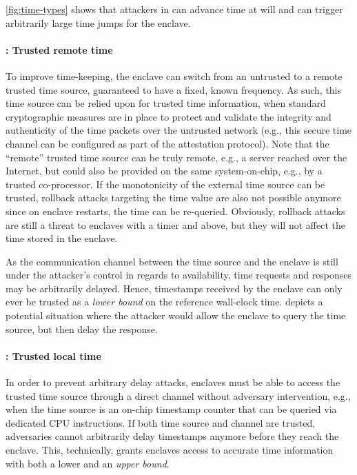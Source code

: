 \cref{fig:time-types} shows that attackers in \Tone{} can advance time at will
and can trigger arbitrarily large time jumps for the enclave.

\paragraph{\Ttwo: Trusted remote time}
To improve time-keeping, the enclave can switch from an untrusted to a remote
trusted time source, guaranteed to have a fixed, known frequency. As such, this
time source can be relied upon for trusted time information, when standard
cryptographic measures are in place to protect and validate the integrity and
authenticity of the time packets over the untrusted network (e.g., this secure
time channel can be configured as part of the attestation protocol). Note that
the ``remote'' trusted time source can be truly remote, e.g., a server reached
over the Internet, but could also be provided on the same system-on-chip, e.g.,
by a trusted co-processor. If the monotonicity of the external time source can
be trusted, rollback attacks targeting the time value are also not possible
anymore since on enclave restarts, the time can be re-queried. Obviously,
rollback attacks are still a threat to enclaves with a \Ttwo{} timer and above,
but they will not affect the time stored in the enclave.

As the communication channel between the time source and the enclave is still
under the attacker's control in regards to availability, \Ttwo{} time requests
and responses may be arbitrarily delayed. Hence, \Ttwo{} timestamps received by
the enclave can only ever be trusted as a \emph{lower bound} on the reference
wall-clock time.  depicts a potential situation where the
attacker would allow the enclave to query the time source, but then delay the
response.

\paragraph{\Tthree: Trusted local time}
In order to prevent arbitrary delay attacks, enclaves must be able to access the
trusted time source through a direct channel without adversary intervention,
e.g., when the time source is an on-chip timestamp counter that can be queried
via dedicated CPU instructions. If both time source and channel are trusted,
adversaries cannot arbitrarily delay timestamps anymore before they reach the
enclave. This, technically, grants enclaves access to accurate time information
with both a lower and an \emph{upper bound}.


